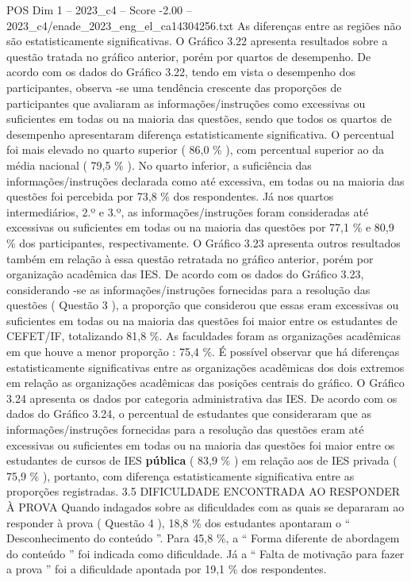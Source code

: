 \begin{textsample}{POS Dim 1 – 2023\_c4 – Score -2.00 – 2023\_c4/enade\_2023\_eng\_el\_ca14304256.txt}
As diferenças entre as regiões não são estatisticamente significativas.
O Gráfico 3.22 apresenta resultados sobre a questão tratada no gráfico anterior, porém por quartos de desempenho.
De acordo com os dados do Gráfico 3.22, tendo em vista o desempenho dos participantes, observa -se uma tendência crescente das proporções de participantes que avaliaram as informações/instruções como excessivas ou suficientes em todas ou na maioria das questões, sendo que todos os quartos de desempenho apresentaram diferença estatisticamente significativa.
O percentual foi mais elevado no quarto superior ( 86,0 \% ), com percentual superior ao da média nacional ( 79,5 \% ).
No quarto inferior, a suficiência das informações/instruções declarada como até excessiva, em todas ou na maioria das questões foi percebida por 73,8 \% dos respondentes.
Já nos quartos intermediários, 2.º e 3.º, as informações/instruções foram consideradas até excessivas ou suficientes em todas ou na maioria das questões por 77,1 \% e 80,9 \% dos participantes, respectivamente.
O Gráfico 3.23 apresenta outros resultados também em relação à essa questão retratada no gráfico anterior, porém por organização acadêmica das IES.
De acordo com os dados do Gráfico 3.23, considerando -se as informações/instruções fornecidas para a resolução das questões ( Questão 3 ), a proporção que considerou que essas eram excessivas ou suficientes em todas ou na maioria das questões foi maior entre os estudantes de CEFET/IF, totalizando 81,8 \%.
As faculdades foram as organizações acadêmicas em que houve a menor proporção : 75,4 \%.
É possível observar que há diferenças estatisticamente significativas entre as organizações acadêmicas dos dois extremos em relação as organizações acadêmicas das posições centrais do gráfico.
O Gráfico 3.24 apresenta os dados por categoria administrativa das IES.
De acordo com os dados do Gráfico 3.24, o percentual de estudantes que consideraram que as informações/instruções fornecidas para a resolução das questões eram até excessivas ou suficientes em todas ou na maioria das questões foi maior entre os estudantes de cursos de IES \textbf{pública} ( 83,9 \% ) em relação aos de IES privada ( 75,9 \% ), portanto, com diferença estatisticamente significativa entre as proporções registradas. 3.5 DIFICULDADE ENCONTRADA AO RESPONDER À PROVA Quando indagados sobre as dificuldades com as quais se depararam ao responder à prova ( Questão 4 ), 18,8 \% dos estudantes apontaram o “ Desconhecimento do conteúdo ”.
Para 45,8 \%, a “ Forma diferente de abordagem do conteúdo ” foi indicada como dificuldade.
Já a “ Falta de motivação para fazer a prova ” foi a dificuldade apontada por 19,1 \% dos respondentes.

\end{textsample}
